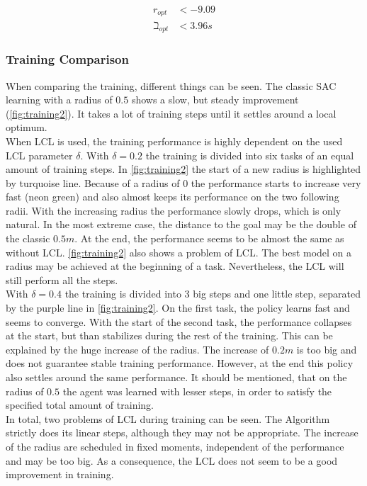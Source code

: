 \begin{align}
	r_{opt} &< -9.09\\
	\beth_{opt} &< 3.96s
\end{align}


\subsubsection{Training Comparison}
When comparing the training, different things can be seen. 
The classic SAC learning with a radius of $0.5$ shows a slow, but steady improvement (\cref{fig:training2}).
It takes a lot of training steps until it settles around a local optimum.\\
\newline
When LCL is used, the training performance is highly dependent on the used LCL parameter $\delta$.
With $\delta=0.2$ the training is divided into six tasks of an equal amount of training steps.
In \cref{fig:training2} the start of a new radius is highlighted by turquoise line.
Because of a radius of $0$ the performance starts to increase very fast (neon green) and also almost keeps
its performance on the two following radii. With the increasing radius the performance slowly drops,
which is only natural. In the most extreme case, the distance to the goal may be the double of 
the classic $0.5m$.
At the end, the performance seems to be almost the same as without LCL.
\cref{fig:training2} also shows a problem of LCL. The best model on a radius may be achieved 
at the beginning of a task. Nevertheless, the LCL will still perform all the steps.\\
\newline
With $\delta=0.4$ the training is divided into 3 big steps and one little step, separated by the 
purple line in \cref{fig:training2}.
On the first task, the policy learns fast and seems to converge.
With the start of the second task, the performance collapses at the start, but than stabilizes
during the rest of the training. This can be explained by the huge increase of the radius.
The increase of $0.2m$ is too big and does not guarantee stable training performance.
However, at the end this policy also settles around the same performance.
It should be mentioned, that on the radius of $0.5$ the agent was learned with lesser steps, in order to 
satisfy the specified total amount of training.\\
\newline
In total, two problems of LCL during training can be seen. The Algorithm strictly does its linear 
steps, although they may not be appropriate. The increase of the radius are scheduled in fixed moments, independent 
of the performance and may be too big. As a consequence, the LCL does not seem to be a 
good improvement in training.


